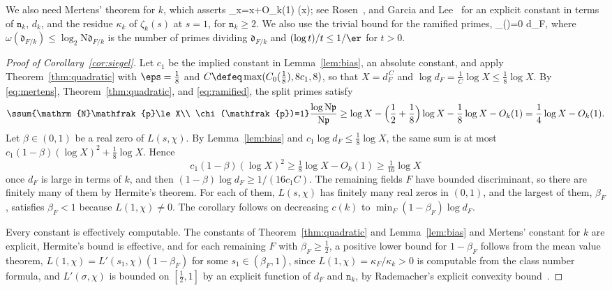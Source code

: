 \documentclass[11pt, reqno, twoside, letterpaper]{amsart}
\newcommand{\Nm}{\mathrm{N}}
\newcommand{\fp}{\mathfrak{p}}
\newcommand{\fd}{\mathfrak{d}}
\newcommand{\dk}{{\mathtt{n}_k}}
\newcommand{\expC}{C}
\newcommand{\XX}{X}
\begin{document}
We also need Mertens' theorem for $k$, which asserts
\be\label{eq:mertens}
\sum_{\Nm\fp\le x}\frac{\log\Nm\fp}{\Nm\fp}=\log x+O_k(1)
\qquad(x);
\ee
see Rosen~\cite{Ro}, and Garcia and Lee~\cite[Theorem~1]{GL} for an
explicit constant in terms of $\dk$, $d_k$, and the residue
$\kappa_k$ of $\zeta_k(s)$ at $s=1$, for $\dk\ge 2$. We also use the
trivial bound for the ramified primes,
\be\label{eq:ramified}
\sum_{\chi(\fp)=0}\frac{\log\Nm\fp}{\Nm\fp}
\le\frac{\omega(\fd_{F/k})}{\er}\le\log d_F,
\ee
where $\omega(\fd_{F/k})\le\log_2\Nm\fd_{F/k}$ is the number of primes
dividing $\fd_{F/k}$ and $(\log t)/t\le 1/\er$ for $t>0$.

\begin{proof}[Proof of Corollary~\ref{cor:siegel}]
Let $c_1$ be the implied constant in Lemma~\ref{lem:bias}, an
absolute constant, and apply Theorem~\ref{thm:quadratic} with
$\eps=\tfrac18$ and $\expC\defeq\max(\expC_0(\tfrac18),8c_1,8)$, so
that $\XX=d_F^{\,\expC}$ and
$\log d_F=\frac{1}{\expC}\log\XX\le\tfrac18\log\XX$.
By \eqref{eq:mertens}, Theorem~\ref{thm:quadratic}, and
\eqref{eq:ramified}, the split primes satisfy
\[
\ssum{\Nm\fp\le\XX\\ \chi(\fp)=1}\frac{\log\Nm\fp}{\Nm\fp}
\ge\log\XX-\Big(\frac12+\frac18\Big)\log\XX-\frac18\log\XX-O_k(1)
=\frac14\log\XX-O_k(1).
\]
Let $\beta\in(0,1)$ be a real zero of $L(s,\chi)$. By
Lemma~\ref{lem:bias} and $c_1\log d_F\le\tfrac18\log\XX$, the same
sum is at most $c_1(1-\beta)(\log\XX)^2+\tfrac18\log\XX$. Hence
\[
c_1(1-\beta)(\log\XX)^2\ge\tfrac18\log\XX-O_k(1)\ge\tfrac1{16}\log\XX
\]
once $d_F$ is large in terms of $k$, and then
$(1-\beta)\log d_F\ge 1/(16c_1\expC)$. The remaining fields $F$
have bounded discriminant, so there are finitely many of them by
Hermite's theorem. For each of them, $L(s,\chi)$ has finitely many
real zeros in $(0,1)$, and the largest of them, $\beta_F$, satisfies
$\beta_F<1$ because $L(1,\chi)\ne 0$. The corollary follows on
decreasing $c(k)$ to $\min_F(1-\beta_F)\log d_F$.

Every constant is effectively computable. The constants of
Theorem~\ref{thm:quadratic} and Lemma~\ref{lem:bias} and Mertens'
constant for $k$ are explicit, Hermite's bound is effective, and for
each remaining $F$ with $\beta_F\ge\tfrac12$, a positive lower bound
for $1-\beta_F$ follows from the mean value theorem,
$L(1,\chi)=L'(s_1,\chi)(1-\beta_F)$ for some $s_1\in(\beta_F,1)$,
since $L(1,\chi)=\kappa_F/\kappa_k>0$ is computable from the class
number formula, and $L'(\sigma,\chi)$ is bounded on $[\tfrac12,1]$ by
an explicit function of $d_F$ and $\dk$, by Rademacher's explicit
convexity bound~\cite[Theorem~5]{Ra}.
\end{proof}
\end{document}
